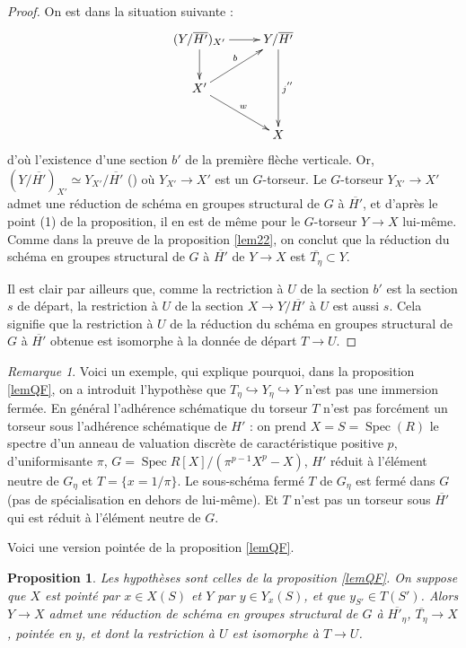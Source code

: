 \documentclass[11pt]{amsart}
\numberwithin{equation}{section}
\newtheorem{prop}[thm]{Proposition}
\theoremstyle{definition}
\theoremstyle{remark}
\newtheorem{rem}[thm]{Remarque}
\DeclareMathOperator{\Spec}{Spec}
\begin{document}
\begin{proof}
On est dans la situation suivante :
\begin{equation}\label{eqFIG5}
\xymatrix{ (Y/\overline{H' })_{X'}\ar[d]\ar[r] & Y/\overline{H' }\ar[dd]^{j^{''}} \\
  X'\ar[rd]^w\ar[ru]^b & \\
 & X }
 \end{equation}
 d'o\`u l'existence d'une section $b'$ de la premi\`ere fl\`eche verticale. Or, $(Y/\overline{H' })_{X'}\simeq Y_{X'}/\overline{H' }$ (\cite[Expos\'e IV, 3.4.3.1]{SGA}) o\`u $Y_{X'} \to X'$  est un $G$-torseur. Le $G$-torseur $Y_{X'} \to X'$ admet une r\'eduction de sch\'ema en groupes structural de $G$ \`a $\overline{H'}$, et d'apr\`es le point (1) de la proposition, il en est de m\^eme pour le $G$-torseur $Y \to X$ lui-m\^eme. Comme dans la preuve de la proposition \ref{lem22}, on conclut que la r\'eduction du sch\'ema en groupes structural de $G$ \`a $\overline {H'}$ de $Y \to X$ est $\overline {T_\eta } \subset Y$.

Il est clair par ailleurs que, comme la rectriction \`a $U$ de la section $b'$ est la section $s$ de d\'epart, la restriction \`a $U$ de la section $X \to Y/\overline{H' }$ \`a $U$ est aussi $s$. Cela signifie que la restriction \`a $U$ de la r\'eduction du sch\'ema en groupes structural de $G$ \`a $\overline {H'}$ obtenue est isomorphe \`a la donn\'ee de d\'epart $T \to U$. \end{proof}

 \begin{rem}\label{exMAU} Voici un exemple, qui explique pourquoi, dans la proposition \ref{lemQF}, on a introduit l'hypoth\`ese  que $T_\eta \hookrightarrow Y_\eta  \hookrightarrow Y $ n'est pas une immersion ferm\'ee. En g\'en\'eral l'adh\'erence sch\'ematique du torseur $T$ n'est pas forc\'ement un torseur sous l'adh\'erence sch\'ematique de $H'$ : on prend $X=S= \Spec (R)$ le spectre d'un anneau de valuation discr\`ete de caract\'eristique positive $p$, d'uniformisante $\pi $, $G= \Spec R[X]/(\pi ^{p-1} X^p -X)$, $H'$ r\'eduit \`a l'\'el\'ement neutre de $G_\eta $ et $T= \{ x=1/\pi \}$. Le sous-sch\'ema ferm\'e $T$ de $G_\eta $ est ferm\'e dans $G$ (pas de sp\'ecialisation en dehors de lui-m\^eme). Et $T$ n'est pas un torseur sous $\overline {H'}$ qui est r\'eduit \`a l'\'el\'ement neutre de $G$.
\end{rem}

Voici une version point\'ee de la proposition \ref{lemQF}.

\begin{prop}\label{lemQFpoint} Les hypoth\`eses sont celles de la proposition \ref{lemQF}. On suppose que $X$ est point\'e par $x\in X(S)$ et $Y$ par $y\in Y_x(S)$, et que $y_{S'}\in T(S')$. Alors $Y \to X$ admet une r\'eduction de sch\'ema en groupes structural de $G$ \`a $\overline {H'_\eta}$, $\overline {T_\eta } \to X$, point\'ee en $y$, et dont la restriction \`a $U$ est isomorphe \`a $T\to U$.
\end{prop}
\end{document}
